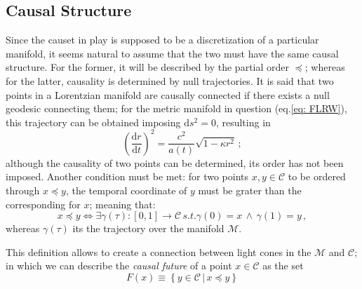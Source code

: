 \documentclass[%
 reprint,
 amsmath,amssymb,
 aps,
]{revtex4-2}
\begin{document}
\subsection{Causal Structure}
Since the causet in play is supposed to be a discretization of a particular manifold, it seems natural to assume that the two must have the same causal structure. For the former, it will be described by the partial order $\preceq$; whereas for the latter, causality is determined by null trajectories. It is said that two points in a Lorentzian manifold are causally connected if there exists a null geodesic connecting them; for the metric manifold in question (eq.\ref{eq: FLRW}), this trajectory can be obtained imposing $\text{d}s^2=0$, resulting in
\begin{equation}
    \left(\frac{\text{d}r}{\text{d}t}\right)^2=\frac{c^2}{a(t)}\sqrt{1-\kappa r^2}\,;
\end{equation}
although the causality of two points can be determined, its order has not been imposed. Another condition must be met: for two points $x,y\in\mathcal{C}$ to be ordered through $x\preceq y$, the temporal coordinate of $y$ must be grater than the corresponding for $x$; meaning that:
\begin{equation}
    x\preceq y \iff\exists \gamma(\tau):[0,1]\to\mathcal{C}\,s.t. \gamma(0)=x\,\land\,\gamma(1)=y\,,
\end{equation}
whereas $\gamma(\tau)$ its the trajectory over the manifold $\mathcal{M}$.

This definition allows to create a connection between light cones in the $\mathcal{M}$ and $\mathcal{C}$; in which we can describe the \textit{causal future} of a point $x\in\mathcal{C}$ as the set
\begin{equation}
    F(x)\equiv\left\{y\in\mathcal{C}\,|\,x\preceq y\right\}
\end{equation}
\end{document}
